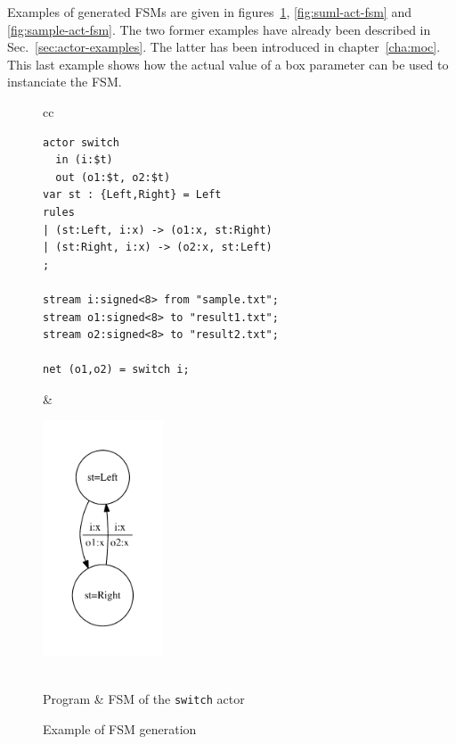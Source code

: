 \medskip
Examples of generated FSMs are given in figures~\ref{fig:switch-act-fsm}, \ref{fig:suml-act-fsm} and
\ref{fig:sample-act-fsm}. The two former examples have already been described in
Sec.~\ref{sec:actor-examples}. The latter has been introduced in chapter~\ref{cha:moc}. This last
example shows how the actual value of a box parameter can be used to instanciate the FSM.

\begin{figure}[h]
\begin{tabular}[c]{cc}
  \begin{minipage}[b]{0.5\linewidth}
    \begin{lstlisting}
actor switch
  in (i:$t)
  out (o1:$t, o2:$t)
var st : {Left,Right} = Left
rules
| (st:Left, i:x) -> (o1:x, st:Right)
| (st:Right, i:x) -> (o2:x, st:Left)
;

stream i:signed<8> from "sample.txt";
stream o1:signed<8> to "result1.txt";
stream o2:signed<8> to "result2.txt";

net (o1,o2) = switch i;
    \end{lstlisting} 
  \end{minipage} &
  \begin{minipage}[b]{0.5\linewidth}
  \includegraphics[height=7cm]{figs/switch-act-fsm}
  \end{minipage} \\
Program & FSM of the \texttt{switch} actor
\end{tabular}
  \caption{Example of FSM generation}
  \label{fig:switch-act-fsm}
\end{figure}

